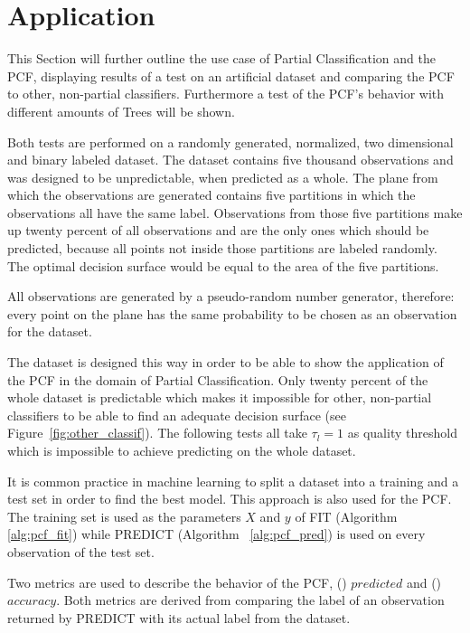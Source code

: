 \section{Application}
\label{sec:application}

This Section will further outline the use case of Partial
Classification and the PCF, displaying results of a test on
an artificial dataset and comparing the PCF to other,
non-partial classifiers. Furthermore a test of the
PCF's behavior with different amounts of Trees will be
shown.

Both tests are performed on a randomly generated,
normalized, two dimensional and binary labeled dataset. The
dataset contains five thousand observations and was
designed to be unpredictable, when predicted as a whole.
The plane from which the observations are generated
contains five partitions in which the observations all have
the same label. Observations from those five partitions
make up twenty percent of all observations and are the only
ones which should be predicted, because all points not
inside those partitions are labeled randomly. The optimal
decision surface would be equal to the area of the five
partitions.

All observations are generated by a pseudo-random number
generator\cite[chapter 9.6]{python}, therefore: every point
on the plane has the same probability to be chosen as an
observation for the dataset.

The dataset is designed this way in order to be able to
show the application of the PCF in the domain of Partial
Classification. Only twenty percent of the whole dataset is
predictable which makes it impossible for other,
non-partial classifiers to be able to find an adequate
decision surface (see Figure~\ref{fig:other_classif}). The
following tests all take $\tau_l = 1$ as quality threshold
which is impossible to achieve predicting on the whole
dataset.

It is common practice in machine learning to split a
dataset into a training and a test set in order to find
the best model.\cite[chapter 18]{ki}
This approach is also used for the PCF. The training set is
used as the parameters $X$ and $y$ of FIT (Algorithm~%
\ref{alg:pcf_fit}) while PREDICT (Algorithm~%
\ref{alg:pcf_pred}) is used on every observation of the
test set.

Two metrics are used to describe the behavior of the PCF,
() $predicted$ and ()
$accuracy$. Both metrics are derived from comparing the
label of an observation returned by PREDICT with its actual
label from the dataset.

